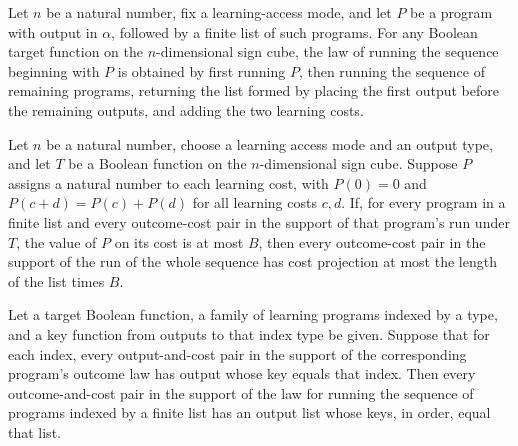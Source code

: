 \begin{theorem}
\label{FABL.LearningProgram.runWithCost_sequence_cons}
\leanok
{}
Let $n$ be a natural number, fix a learning-access mode, and let $P$ be a program with
output in $\alpha$, followed by a finite list of such programs. For any Boolean target
function on the $n$-dimensional sign cube, the law of running the sequence beginning
with $P$ is obtained by first running $P$, then running the sequence of remaining
programs, returning the list formed by placing the first output before the remaining
outputs, and adding the two learning costs.
\end{theorem}

\begin{theorem}
\label{FABL.LearningProgram.costProjection_le_of_mem_support_sequence}
\leanok
{}
Let $n$ be a natural number, choose a learning access mode and an output type, and let
$T$ be a Boolean function on the $n$-dimensional sign cube. Suppose $P$ assigns a
natural number to each learning cost, with $P(0)=0$ and $P(c+d)=P(c)+P(d)$ for all
learning costs $c,d$. If, for every program in a finite list and every outcome-cost pair
in the support of that program's run under $T$, the value of $P$ on its cost is at most
$B$, then every outcome-cost pair in the support of the run of the whole sequence has
cost projection at most the length of the list times $B$.
\end{theorem}

\begin{theorem}
\label{FABL.LearningProgram.map_output_eq_of_mem_support_sequence}
\leanok
{}
Let a target Boolean function, a family of learning programs indexed by a type, and a
key function from outputs to that index type be given. Suppose that for each index,
every output-and-cost pair in the support of the corresponding program's outcome law has
output whose key equals that index. Then every outcome-and-cost pair in the support of
the law for running the sequence of programs indexed by a finite list has an output list
whose keys, in order, equal that list.
\end{theorem}

